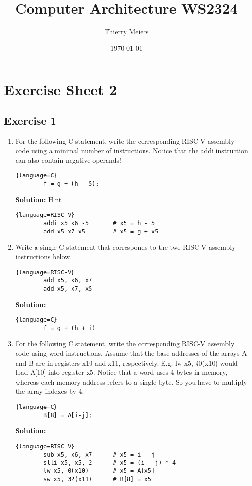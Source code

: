 \documentclass{report}
\title{Computer Architecture WS2324}
\author{Thierry Meiers}
\date{\today}
\begin{document}
\maketitle

\chapter*{Exercise Sheet 2}
\section*{Exercise 1}
\begin{enumerate}
    \item
    {
        For the following C statement, write the corresponding RISC-V assembly code using a minimal number of instructions. Notice that the addi instruction can also contain negative operands!
        \begin{lstlisting}{language=C}
        f = g + (h - 5);
        \end{lstlisting}
        \textbf{Solution:}
        \href{https://stackoverflow.com/a/61046459}{Hint}
        \begin{lstlisting}{language=RISC-V}
        addi x5 x6 -5       # x5 = h - 5
        add x5 x7 x5        # x5 = g + x5
        \end{lstlisting}
    }
    \item
    {
        Write a single C statement that corresponds to the two RISC-V assembly instructions below.
        \begin{lstlisting}{language=RISC-V}
        add x5, x6, x7
        add x5, x7, x5
        \end{lstlisting}
        \textbf{Solution:}
        \begin{lstlisting}{language=C}
        f = g + (h + i)
        \end{lstlisting}
    }
    \item 
    {
        For the following C statement, write the corresponding RISC-V assembly code using word
        instructions. Assume that the base addresses of the arrays A and B are in registers x10 and
        x11, respectively. E.g. lw x5, 40(x10) would load A[10] into register x5.
        Notice that a word uses 4 bytes in memory, whereas each memory address refers to a single
        byte. So you have to multiply the array indexes by 4.
        \begin{lstlisting}{language=C}
        B[8] = A[i-j];
        \end{lstlisting}
        \textbf{Solution:}
        \begin{lstlisting}{language=RISC-V}
        sub x5, x6, x7      # x5 = i - j
        slli x5, x5, 2      # x5 = (i - j) * 4
        lw x5, 0(x10)       # x5 = A[x5]
        sw x5, 32(x11)      # B[8] = x5        
        \end{lstlisting}
    }
\end{enumerate}
\end{document}
